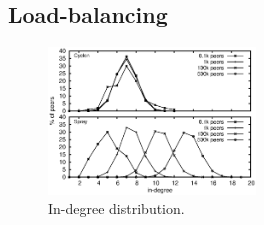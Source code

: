 
\subsection{Load-balancing}

\begin{figure}
  \centering
  \includegraphics[width=0.49\textwidth]{img/histo.eps}
  \caption{\label{fig:histo}In-degree distribution.}
\end{figure}

